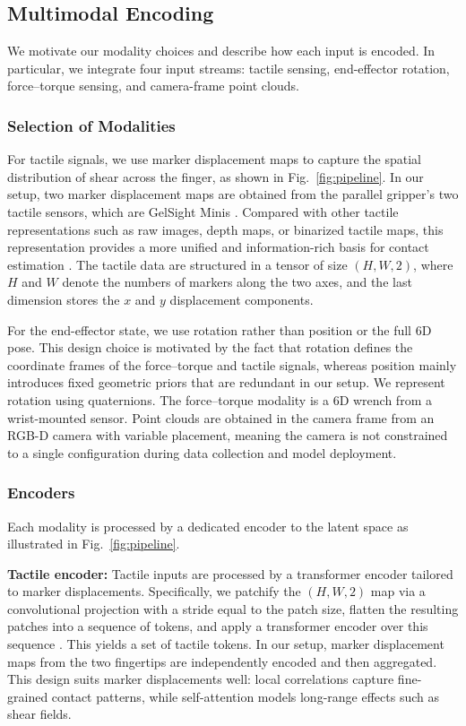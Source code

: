 \documentclass[letterpaper, 10 pt, conference]{ieeeconf}  %
\begin{document}
\subsection{Multimodal Encoding}\label{sec:encoders}

We motivate our modality choices and describe how each input is encoded. In particular, we integrate four input streams: tactile sensing, end-effector rotation, force–torque sensing, and camera-frame point clouds.


\subsubsection{Selection of Modalities}
For tactile signals, we use marker displacement maps to capture the spatial distribution of shear across the finger, as shown in Fig.~\ref{fig:pipeline}. In our setup, two marker displacement maps are obtained from the parallel gripper’s two tactile sensors, which are GelSight Minis \cite{yuan2017gelsight}. Compared with other tactile representations such as raw images, depth maps, or binarized tactile maps, this representation provides a more unified and information-rich basis for contact estimation \cite{ma2021extrinsic}. The tactile data are structured in a tensor of size $(H, W, 2)$, where $H$ and $W$ denote the numbers of markers along the two axes, and the last dimension stores the $x$ and $y$ displacement components.

For the end-effector state, we use rotation rather than position or the full 6D pose. This design choice is motivated by the fact that rotation defines the coordinate frames of the force–torque and tactile signals, whereas position mainly introduces fixed geometric priors that are redundant in our setup. We represent rotation using quaternions. The force–torque modality is a 6D wrench from a wrist-mounted sensor. Point clouds are obtained in the camera frame from an RGB-D camera with variable placement, meaning the camera is not constrained to a single configuration during data collection and model deployment. 


\subsubsection{Encoders}

Each modality is processed by a dedicated encoder to the latent space as illustrated in Fig.~\ref{fig:pipeline}. 


\textbf{Tactile encoder:}  
Tactile inputs are processed by a transformer encoder tailored to marker displacements. Specifically, we patchify the $(H, W, 2)$ map via a convolutional projection with a stride equal to the patch size, flatten the resulting patches into a sequence of tokens, and apply a transformer encoder over this sequence \cite{dosovitskiy2020vit}. This yields a set of tactile tokens. In our setup, marker displacement maps from the two fingertips are independently encoded and then aggregated. This design suits marker displacements well: local correlations capture fine-grained contact patterns, while self-attention models long-range effects such as shear fields.
\end{document}
